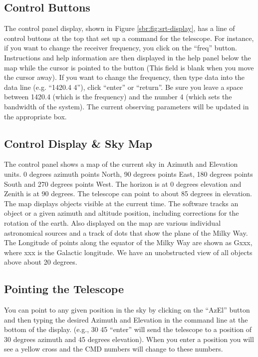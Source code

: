 \subsection{Control Buttons}
The control panel display, shown in Figure \ref{sbr:fig:srt-display}, has a line of control buttons at the top that set
up a command for the telescope. For instance, if you want to change the receiver
frequency, you click on the “freq” button. Instructions and help information are
then displayed in the help panel below the map while the cursor is pointed to the
button (This field is blank when you move the cursor away). If you want to
change the frequency, then type data into the data line (e.g. “1420.4 4”), click
“enter” or “return”. Be sure you leave a space between 1420.4 (which is the
frequency) and the number 4 (which sets the bandwidth of the system). The
current observing parameters will be updated in the appropriate box.

\subsection{Control Display \& Sky Map}
The control panel shows a map of the current sky in Azimuth and
Elevation units. 0 degrees azimuth points North, 90 degrees points East, 180
degrees points South and 270 degrees points West. The horizon is at 0 degrees
elevation and Zenith is at 90 degrees. The telescope can point to about 85
degrees in elevation.
The map displays objects visible at the current time. The software tracks
an object or a given azimuth and altitude position, including corrections for the
rotation of the earth. Also displayed on the map are various individual
astronomical sources and a track of dots that show the plane of the Milky Way.
The Longitude of points along the equator of the Milky Way are shown as Gxxx,
where xxx is the Galactic longitude. We have an unobstructed view of all objects
above about 20 degrees.

\subsection{Pointing the Telescope}
You can point to any given position in the sky by clicking on the “AzEl”
button and then typing the desired Azimuth and Elevation in the command line at
the bottom of the display. (e.g., 30 45 “enter” will send the telescope to a position
of 30 degrees azimuth and 45 degrees elevation). When you enter a position you
will see a yellow cross and the CMD numbers will change to these numbers. 

